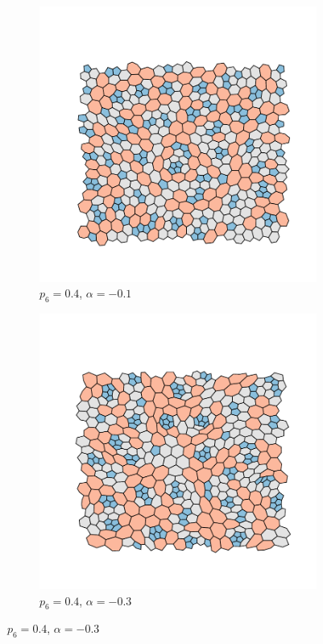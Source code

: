 \begin{figure}[bt]
     \begin{subfigure}[b]{0.45\textwidth}
         \centering
         \includegraphics[width=\textwidth]{./figures/targeted_opt/topt_-10.pdf}
         \caption{$p_6=0.4$, $\alpha=-0.1$}
         \label{fig:toptconfigs3}
     \end{subfigure}
     \hfill
     \begin{subfigure}[b]{0.45\textwidth}
         \centering
         \includegraphics[width=\textwidth]{./figures/targeted_opt/topt_-30.pdf}
         \caption{$p_6=0.4$, $\alpha=-0.3$}
         \label{fig:toptconfigs4}
     \end{subfigure}
     \hfill


\end{figure}
